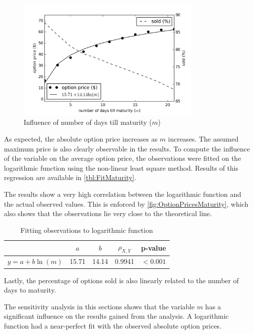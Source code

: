 \begin{figure}
    \centering
    \includegraphics[width=0.8\textwidth]{figures/OptionPricesMaturity}
    \caption{Influence of number of days till maturity ($m$)}
    \label{fig:OptionPricesMaturity}
\end{figure}


As expected, the absolute option price increases as $m$ increases. The assumed maximum price is also clearly observable in the results. To compute the influence of the variable on the average option price, the observations were fitted on the logarithmic function using the non-linear least square method. Results of this regression are available in \autoref{tbl:FitMaturity}.

The results show a very high correlation between the logarithmic function and the actual observed values. This is enforced by \autoref{fig:OptionPricesMaturity}, which also shows that the observations lie very close to the theoretical line.


\begin{table}
\centering
\begin{tabular}{l c c c c}
\toprule
~  &  $a$  &  $b$  &  $\rho_{X,Y}$  & p-value  \\
\midrule
$y = a + b \ln(m)$  &  15.71  &  14.14  &  0.9941  &  $< 0.001$ \\
\bottomrule
\end{tabular}
\caption{Fitting observations to logarithmic function}
\label{tbl:FitMaturity}
\end{table}


Lastly, the percentage of options sold is also linearly related to the number of days to maturity.

The sensitivity analysis in this sections shows that the variable $m$ has a significant influence on the results gained from the analysis. A logarithmic function had a near-perfect fit with the observed absolute option prices.


